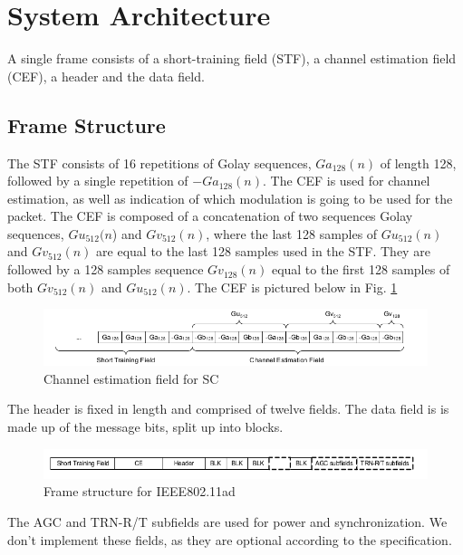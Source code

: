 \documentclass[conference]{IEEEtran}
\begin{document}
\section{System Architecture}
A single frame consists of a short-training field (STF), a channel estimation field (CEF), a header and the data field. 
\subsection{Frame Structure}The STF consists of 16 repetitions of Golay sequences, $Ga_{128}(n)$ of length 128, followed by a single repetition of $-Ga_{128}(n)$. The CEF is used for channel estimation, as well as indication of which modulation is
going to be used for the packet. The CEF is composed of a concatenation of two
sequences Golay sequences, $Gu_{512}(n$) and $Gv_{512}(n)$, where the last 128 samples of $Gu_{512} (n)$ and $Gv_{512} (n)$ are equal to the last
128 samples used in the STF. They are followed by a 128 samples sequence $Gv_{128}(n)$ equal
to the first 128 samples of both $Gv_{512}(n)$ and $Gu_{512}(n)$. The CEF is pictured below in Fig. \ref{cef}
\begin{figure}[htbp]
\centerline{\includegraphics[scale=.35]{./media/cef.png}}
\caption{Channel estimation field for SC}
\label{cef}
\end{figure}


The header is fixed in length and comprised of twelve fields. The data field is is made up of the message bits, split up into blocks. 
\begin{figure}[htbp]
\centerline{\includegraphics[scale=.35]{./media/frame.png}}
\caption{Frame structure for IEEE802.11ad}
\label{phy}
\end{figure}


The AGC and TRN-R/T subfields are used for power and synchronization. We don't implement these fields, as they are optional according to the specification.
\end{document}
